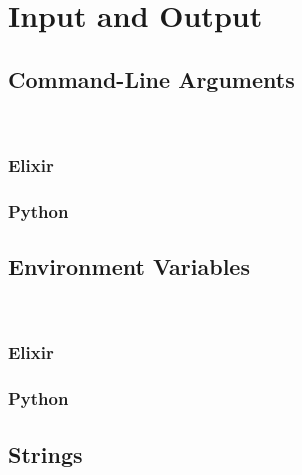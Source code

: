 \chapter{Input and Output}

\section{Command-Line Arguments}
\subsection{\csharp}


\inputminted{csharp}{../src/csharp/io/cla/Program.cs}


\inputminted{console}{../src/csharp/io/cla/interaction.txt}

\subsection{Elixir}
\subsection{Python}

\section{Environment Variables}
\subsection{\csharp}


\inputminted{csharp}{../src/csharp/io/envvar/Program.cs}


\inputminted{console}{../src/csharp/io/envvar/interaction.txt}

\subsection{Elixir}
\subsection{Python}

\section{Strings}
\label{sec:io:strings}
